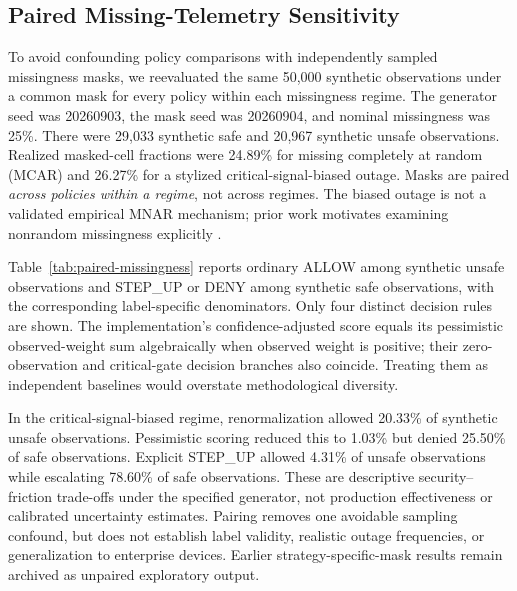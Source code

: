 \documentclass[journal]{IEEEtran}
\begin{document}
\subsection{Paired Missing-Telemetry Sensitivity}
To avoid confounding policy comparisons with independently sampled missingness
masks, we reevaluated the same 50,000 synthetic observations under a common
mask for every policy within each missingness regime. The generator seed was
20260903, the mask seed was 20260904, and nominal missingness was 25\%.
There were 29,033 synthetic safe and 20,967 synthetic unsafe observations.
Realized masked-cell fractions were 24.89\% for missing completely at random
(MCAR) and 26.27\% for a stylized critical-signal-biased outage.
Masks are paired \emph{across policies within a regime}, not across regimes.
The biased outage is not a validated empirical MNAR mechanism; prior work
motivates examining nonrandom missingness explicitly
\cite{pereira2024mnar}.


Table~\ref{tab:paired-missingness} reports ordinary ALLOW among synthetic
unsafe observations and STEP\_UP or DENY among synthetic safe observations,
with the corresponding label-specific denominators. Only four distinct
decision rules are shown. The implementation's confidence-adjusted
score equals its pessimistic observed-weight sum algebraically when
observed weight is positive; their zero-observation and critical-gate
decision branches also coincide. Treating them as independent baselines
would overstate methodological diversity.

In the critical-signal-biased regime, renormalization allowed 20.33\%
of synthetic unsafe observations. Pessimistic scoring reduced this to
1.03\% but denied 25.50\% of safe observations. Explicit STEP\_UP
allowed 4.31\% of unsafe observations while escalating 78.60\% of safe
observations. These are descriptive security--friction trade-offs under
the specified generator, not production effectiveness or calibrated
uncertainty estimates. Pairing removes one avoidable sampling confound,
but does not establish label validity, realistic outage frequencies, or
generalization to enterprise devices. Earlier strategy-specific-mask
results remain archived as unpaired exploratory output.
\end{document}
